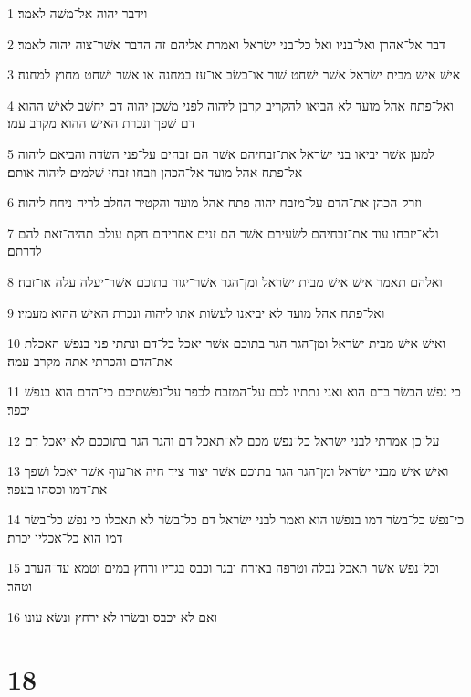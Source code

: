 \par 1 וידבר יהוה אל־משׁה לאמר׃
\par 2 דבר אל־אהרן ואל־בניו ואל כל־בני ישׂראל ואמרת אליהם זה הדבר אשׁר־צוה יהוה לאמר׃
\par 3 אישׁ אישׁ מבית ישׂראל אשׁר ישׁחט שׁור או־כשׂב או־עז במחנה או אשׁר ישׁחט מחוץ למחנה׃
\par 4 ואל־פתח אהל מועד לא הביאו להקריב קרבן ליהוה לפני משׁכן יהוה דם יחשׁב לאישׁ ההוא דם שׁפך ונכרת האישׁ ההוא מקרב עמו׃
\par 5 למען אשׁר יביאו בני ישׂראל את־זבחיהם אשׁר הם זבחים על־פני השׂדה והביאם ליהוה אל־פתח אהל מועד אל־הכהן וזבחו זבחי שׁלמים ליהוה אותם׃
\par 6 וזרק הכהן את־הדם על־מזבח יהוה פתח אהל מועד והקטיר החלב לריח ניחח ליהוה׃
\par 7 ולא־יזבחו עוד את־זבחיהם לשׂעירם אשׁר הם זנים אחריהם חקת עולם תהיה־זאת להם לדרתם׃
\par 8 ואלהם תאמר אישׁ אישׁ מבית ישׂראל ומן־הגר אשׁר־יגור בתוכם אשׁר־יעלה עלה או־זבח׃
\par 9 ואל־פתח אהל מועד לא יביאנו לעשׂות אתו ליהוה ונכרת האישׁ ההוא מעמיו׃
\par 10 ואישׁ אישׁ מבית ישׂראל ומן־הגר הגר בתוכם אשׁר יאכל כל־דם ונתתי פני בנפשׁ האכלת את־הדם והכרתי אתה מקרב עמה׃
\par 11 כי נפשׁ הבשׂר בדם הוא ואני נתתיו לכם על־המזבח לכפר על־נפשׁתיכם כי־הדם הוא בנפשׁ יכפר׃
\par 12 על־כן אמרתי לבני ישׂראל כל־נפשׁ מכם לא־תאכל דם והגר הגר בתוככם לא־יאכל דם׃
\par 13 ואישׁ אישׁ מבני ישׂראל ומן־הגר הגר בתוכם אשׁר יצוד ציד חיה או־עוף אשׁר יאכל ושׁפך את־דמו וכסהו בעפר׃
\par 14 כי־נפשׁ כל־בשׂר דמו בנפשׁו הוא ואמר לבני ישׂראל דם כל־בשׂר לא תאכלו כי נפשׁ כל־בשׂר דמו הוא כל־אכליו יכרת׃
\par 15 וכל־נפשׁ אשׁר תאכל נבלה וטרפה באזרח ובגר וכבס בגדיו ורחץ במים וטמא עד־הערב וטהר׃
\par 16 ואם לא יכבס ובשׂרו לא ירחץ ונשׂא עונו׃

\chapter{18}

